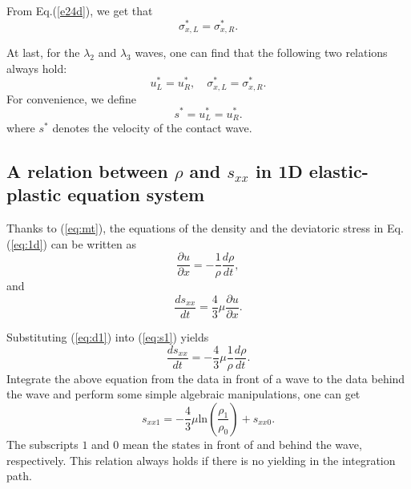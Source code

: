 \documentclass[review]{elsarticle}
\begin{document}

From  Eq.(\ref{e24d}), we  get that
\begin{equation}   \label{e27a}
\sigma_{x,L} ^{\ast}=  \sigma_{x,R} ^{\ast}.
\end{equation}


At last, for the $\lambda_{2}$ and $\lambda_{3}$ waves, one can find
that the following two relations always hold:
\begin{equation}   \label{e28}
u_{L}^{\ast}=u_{R}^{\ast}, \quad
\sigma_{x,L}^{\ast}=\sigma_{x,R}^{\ast}.
\end{equation}
For convenience, we define
\begin{equation}\label{eq:contact}
  s^* = u_L^* = u_R^*. %
\end{equation}
where $s^*$ denotes the velocity of the contact wave.
\subsection{A relation between $\rho$ and $s_{xx}$ in 1D elastic-plastic  equation system}

Thanks to (\ref{eq:mt}), the equations of the density and the deviatoric stress in Eq.(\ref{eq:1d}) can be written as
  \begin{equation}\label{eq:d1}
    \frac{\partial u}{\partial x} = -\frac{1}{\rho}\frac{d\rho}{dt},
  \end{equation}
  and
  \begin{equation}\label{eq:s1}
    \frac{ds_{xx}}{dt}=\frac{4}{3}\mu\frac{\partial u}{\partial x}.
  \end{equation}

  Substituting (\ref{eq:d1}) into (\ref{eq:s1}) yields
  \begin{equation}
    \frac{ds_{xx}}{dt}=-\frac{4}{3}\mu \frac{1}{\rho}\frac{d\rho}{dt}.
\end{equation}
Integrate the above equation from the data in front of a wave to the data behind the wave and perform some simple algebraic manipulations, one can get
\begin{equation}\label{eq:rhosxx}
  s_{xx1}=-\frac{4}{3}\mu\text{ln}(\frac{\rho_{1}}{\rho_{0}})+s_{xx0}.
\end{equation}
The subscripts $1$ and $0$ mean the states in front of and behind the wave, respectively.
This relation always holds if there is no yielding in the integration path.
\end{document}
